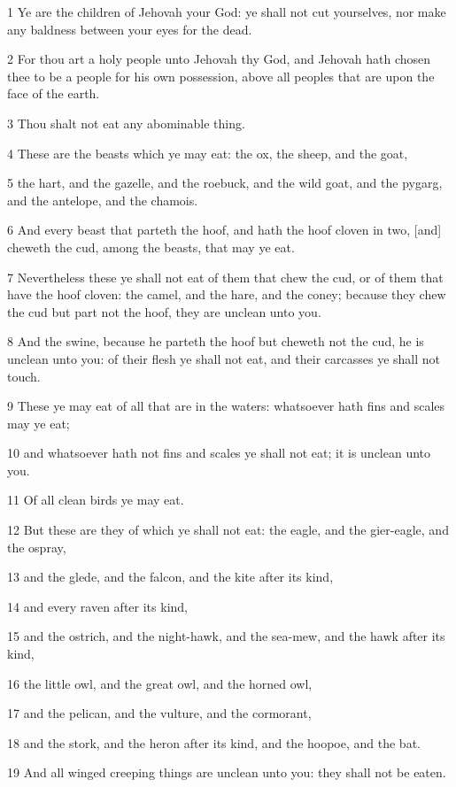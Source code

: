 \par 1 Ye are the children of Jehovah your God: ye shall not cut yourselves, nor make any baldness between your eyes for the dead.
\par 2 For thou art a holy people unto Jehovah thy God, and Jehovah hath chosen thee to be a people for his own possession, above all peoples that are upon the face of the earth.
\par 3 Thou shalt not eat any abominable thing.
\par 4 These are the beasts which ye may eat: the ox, the sheep, and the goat,
\par 5 the hart, and the gazelle, and the roebuck, and the wild goat, and the pygarg, and the antelope, and the chamois.
\par 6 And every beast that parteth the hoof, and hath the hoof cloven in two, [and] cheweth the cud, among the beasts, that may ye eat.
\par 7 Nevertheless these ye shall not eat of them that chew the cud, or of them that have the hoof cloven: the camel, and the hare, and the coney; because they chew the cud but part not the hoof, they are unclean unto you.
\par 8 And the swine, because he parteth the hoof but cheweth not the cud, he is unclean unto you: of their flesh ye shall not eat, and their carcasses ye shall not touch.
\par 9 These ye may eat of all that are in the waters: whatsoever hath fins and scales may ye eat;
\par 10 and whatsoever hath not fins and scales ye shall not eat; it is unclean unto you.
\par 11 Of all clean birds ye may eat.
\par 12 But these are they of which ye shall not eat: the eagle, and the gier-eagle, and the ospray,
\par 13 and the glede, and the falcon, and the kite after its kind,
\par 14 and every raven after its kind,
\par 15 and the ostrich, and the night-hawk, and the sea-mew, and the hawk after its kind,
\par 16 the little owl, and the great owl, and the horned owl,
\par 17 and the pelican, and the vulture, and the cormorant,
\par 18 and the stork, and the heron after its kind, and the hoopoe, and the bat.
\par 19 And all winged creeping things are unclean unto you: they shall not be eaten.
